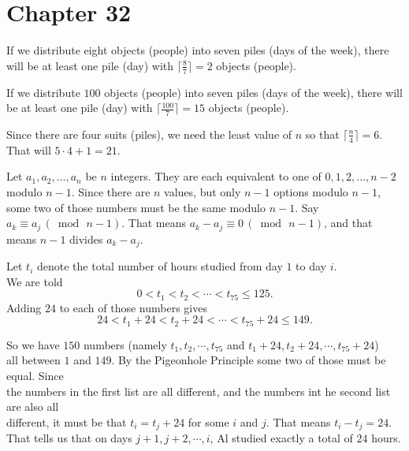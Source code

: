   \section*{Chapter 32}
    
\begin{Solution}{32.1}


If we distribute eight objects (people) into seven piles (days of the week),
there will be at least one pile (day) with $\lceil\frac{8}{7}\rceil = 2$ objects (people).

\end{Solution}

\begin{Solution}{32.2}

If we distribute $100$ objects (people) into seven piles (days of the week),
there will be at least one pile (day) with  $\lceil\frac{100}{7}\rceil = 15$ objects (people).

\end{Solution}

\begin{Solution}{32.3}

Since there are four suits (piles), we need the least value of $n$ so that $\lceil\frac{n}{4}\rceil = 6$.
That will $5\cdot 4 + 1 = 21$. 

\end{Solution}

\begin{Solution}{32.4}
Let $a_{1}, a_{2},\ldots ,a_{n}$ be $n$ integers. They are each equivalent to one of $0,1,2, \ldots, n-2$ modulo $n-1$.
Since there are $n$ values, but only $n-1$ options modulo $n-1$, some two of those numbers must be the same modulo
$n-1$. Say $a_{k}\equiv a_{j}\, (\bmod\,n-1)$. That means $a_{k}-a_{j}\equiv 0\,(\bmod\,n-1)$, and that means $n-1$ divides $a_{k}-a_{j}$.

\end{Solution}

\begin{Solution}{32.5}

Let $t_i$ denote the total number of hours studied from day $1$ to day $i$.\\
We are told\\
\[
0<t_1<t_2<\cdots <t_{75} \leq 125.
\]
Adding $24$ to each of those numbers gives
\[
24<t_1+24<t_2+24<\cdots <t_{75}+24 \leq 149.
\]

So we have $150$ numbers (namely $t_1, t_2, \cdots, t_{75}$ and $t_1+24, t_2+24, \cdots ,t_{75}+24$)\\
 all between $1$ and $149$.  By the Pigeonhole Principle some two of those must be equal. Since\\ 
the numbers in the first list are all different, and the numbers int he second list are also all \\
different, it must be that $t_i = t_j + 24$ for some $i$ and $j$. That means $t_i - t_j = 24$. \\
That tells us that on days $j+1, j+2,\cdots , i$, Al studied exactly a total of $24$ hours.
\end{Solution}

